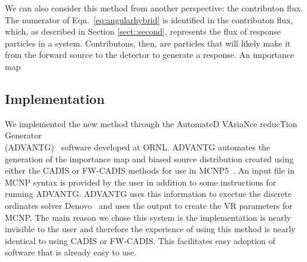 \documentclass[12pt]{article}
\begin{document}
We can also consider this method from another perspective: the contributon flux. 
The numerator of Eqn.~\eqref{eq:angularhybrid} is identified in the contributon flux, which, as described in Section \ref{sect::second}, represents the flux of response particles in a system. 
Contributons, then, are particles that will likely make it from the forward source to the detector to generate a response. 
An importance map %
%
% 

%

\subsection{Implementation}
\label{subsect::implementation}

We implemented the new method through the AutomateD VAriaNce reducTion Generator\\ (ADVANTG)~\cite{wagner_automated_2002, mosher_new_2010} software developed at ORNL. 
ADVANTG automates the generation of the importance map and biased source distribution created using either the CADIS or FW-CADIS methods for use in MCNP5~\cite{brown_mcnp_2002}. 
An input file in MCNP syntax is provided by the user in addition to some instructions for running ADVANTG. 
ADVANTG uses this information to exectue the discrete ordinates solver Denovo~\cite{evans_denovo:_2010} and uses the output to create the VR parameters for MCNP.
The main reason we chose this system is the implementation is nearly invisible to the user and therefore the experience of using this method is nearly identical to using CADIS or FW-CADIS.
This facilitates easy adoption of software that is already easy to use.
\end{document}
